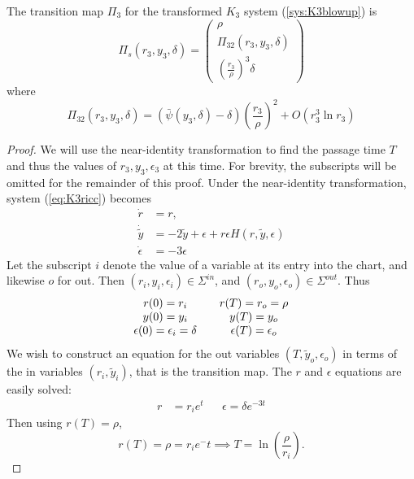 \begin{prop}
	The transition map $\Pi_3$ for the transformed $K_3$ system (\ref{sys:K3blowup}) is
	$$ \Pi_s(r_3,y_3,\delta) = \begin{pmatrix}
	\rho \\ 
	\Pi_{32}(r_3,y_3,\delta) \\ 
	\left(\frac{r_3}{\rho}\right)^3\delta
	\end{pmatrix} $$ 
	where $$\Pi_{32}(r_3,y_3,\delta)=\left(\bar{\psi}(y_3,\delta)-\delta\right)\left(\frac{r_3}{\rho}\right)^2 + O(r^3_3\ln r_3)$$
\end{prop}
\begin{proof}
	We will use the near-identity transformation to find the passage time $T$ and thus the values of $r_3,y_3,\epsilon_3$ at this time. For brevity, the subscripts will be omitted for the remainder of this proof. Under the near-identity transformation, system (\ref{eq:K3ricc}) becomes
	\begin{subequations}
		\begin{align}
		\dot{r} &= r,\label{sys:K3riccNIr}\\
		\dot{\tilde{y}}&=-2\tilde{y}+\epsilon+r\epsilon H(r,\tilde{y},\epsilon)\label{sys:K3riccNIy}\\
		\dot{\epsilon} &= -3\epsilon
		\label{sys:K3riccNIeps}
		\end{align}
	\end{subequations}
	Let the subscript $i$ denote the value of a variable at its entry into the chart, and likewise $o$ for out. Then $(r_i,y_i,\epsilon_i)\in \Sigma^{in}$, and $(r_o,y_o,\epsilon_o)\in \Sigma^{out}$. Thus 
	$$\begin{array}{c c c}
	r(0)=r_i & &r(T)=r_o=\rho\\
	y(0)=y_i & &y(T)=y_o\\
	\epsilon(0)=\epsilon_i=\delta& & \epsilon(T)=\epsilon_o
	\end{array}
	$$
	We wish to construct an equation for the out variables $(T,\tilde{y}_o,\epsilon_o)$ in terms of the in variables $ (r_i,\tilde{y}_i) $, that is the transition map. The $r$ and $\epsilon$ equations are easily solved:
	\begin{align}
	r&=r_ie^t &&\epsilon=\delta e^{-3t}
	\end{align}
	Then using $r(T)=\rho$, 
	$$r(T)=\rho=r_ie^-t \implies T=\ln\left(\frac{\rho}{r_i}\right).$$
	

\end{proof}
